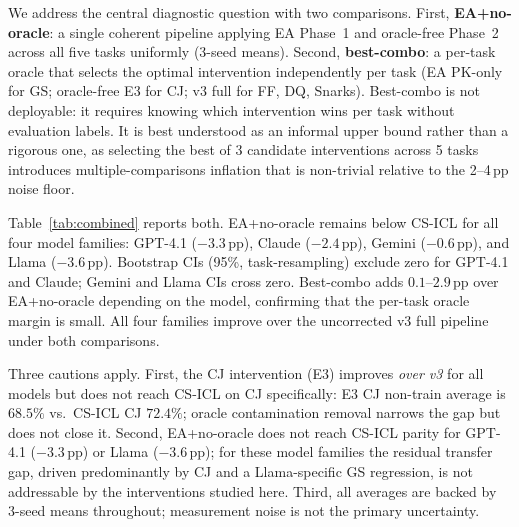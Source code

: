 \documentclass{article}
\begin{document}
We address the central diagnostic question with two comparisons.
First, \textbf{EA+no-oracle}: a single coherent pipeline applying EA Phase~1 and
oracle-free Phase~2 across all five tasks uniformly (3-seed means).
Second, \textbf{best-combo}: a per-task oracle that selects the optimal intervention
independently per task (EA PK-only for GS; oracle-free E3 for CJ; v3 full for FF, DQ, Snarks).
Best-combo is not deployable: it requires knowing which intervention wins per task without
evaluation labels. It is best understood as an informal upper bound rather than a
rigorous one, as selecting the best of 3 candidate interventions across 5 tasks introduces
multiple-comparisons inflation that is non-trivial relative to the 2--4\,pp noise floor.

Table~\ref{tab:combined} reports both.
EA+no-oracle remains below CS-ICL for all four model families: GPT-4.1 ($-3.3$\,pp),
Claude ($-2.4$\,pp), Gemini ($-0.6$\,pp), and Llama ($-3.6$\,pp).
Bootstrap CIs (95\%, task-resampling) exclude zero for GPT-4.1 and Claude; Gemini and Llama
CIs cross zero.
Best-combo adds $0.1$--$2.9$\,pp over EA+no-oracle depending on the model, confirming
that the per-task oracle margin is small.
All four families improve over the uncorrected v3 full pipeline under both comparisons.

Three cautions apply.
First, the CJ intervention (E3) improves \emph{over v3} for all models but does not reach
CS-ICL on CJ specifically: E3 CJ non-train average is $68.5\%$ vs.\ CS-ICL CJ $72.4\%$;
oracle contamination removal narrows the gap but does not close it.
Second, EA+no-oracle does not reach CS-ICL parity for GPT-4.1 ($-3.3$\,pp) or Llama ($-3.6$\,pp);
for these model families the residual transfer gap, driven predominantly by CJ and a
Llama-specific GS regression, is not addressable by the interventions studied here.
Third, all averages are backed by 3-seed means throughout; measurement noise is not the
primary uncertainty.
\end{document}
